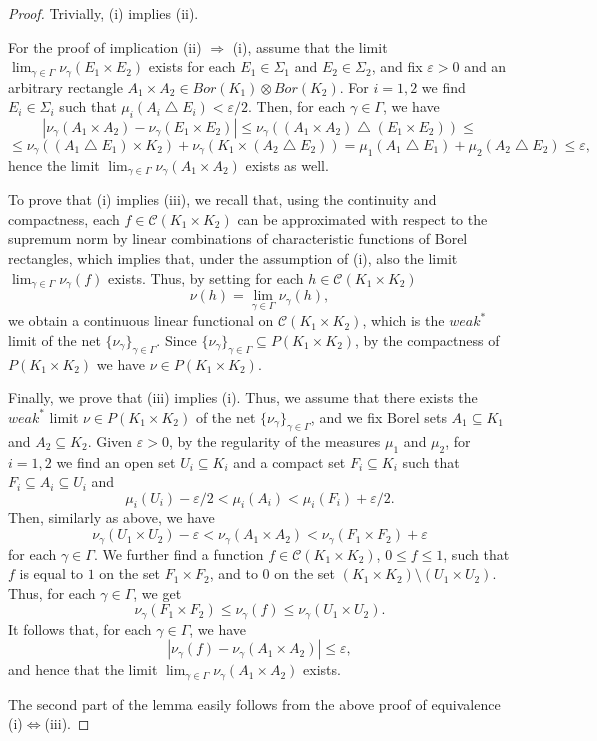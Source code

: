 \documentclass[12pt,fleqn]{amsart}
\numberwithin{equation}{section}
\theoremstyle{definition}
\def\C{\mathcal C}
\def\ep{\varepsilon}
\newcommand{\abs}[1]{\left| #1  \right|}
\begin{document}
\begin{proof}
Trivially, (i) implies (ii). 

For the proof of implication (ii) $\Rightarrow$ (i), assume that the limit $\lim_{\gamma \in \Gamma} \nu_{\gamma}(E_1 \times E_2)$ exists for each $E_1 \in \Sigma_1$ and $E_2 \in \Sigma_2$, and fix $\ep>0$ and an arbitrary rectangle $A_1 \times A_2 \in Bor(K_1) \otimes Bor(K_2)$. For $i=1, 2$ we find $E_i \in \Sigma_i$ such that $\mu_i(A_i \bigtriangleup E_i)<\ep/2$. Then, for each $\gamma \in \Gamma$, we have
\[|\nu_\gamma(A_1\times A_2)-\nu_\gamma(E_1\times E_2)|\le\nu_{\gamma}((A_1 \times A_2) \bigtriangleup (E_1 \times E_2))\leq\]
\[\le\nu_{\gamma}((A_1 \bigtriangleup E_1) \times K_2)+\nu_{\gamma}(K_1 \times (A_2 \bigtriangleup E_2)) =\mu_1(A_1 \bigtriangleup E_1)+\mu_2(A_2 \bigtriangleup E_2) \leq \ep,\]
hence the limit $\lim_{\gamma\in\Gamma}\nu_\gamma(A_1\times A_2)$ exists as well.

To prove that (i) implies (iii), we recall that, using the continuity and compactness, each $f \in \C(K_1 \times K_2)$ can be approximated with respect to the supremum norm by linear combinations of characteristic functions of Borel rectangles, which implies that, under the assumption of (i), also the limit $\lim_{\gamma \in \Gamma} \nu_{\gamma}(f)$ exists. Thus, by setting for each $h \in \C(K_1 \times K_2)$
\[\nu(h)=\lim_{\gamma \in \Gamma} \nu_{\gamma}(h),\]
we obtain a continuous linear functional on $\C(K_1 \times K_2)$,  which is the $weak^\ast$ limit of the net $\{ \nu_{\gamma} \}_{\gamma \in \Gamma}$. Since $\{ \nu_{\gamma} \}_{\gamma \in \Gamma}\subseteq P(K_1\times K_2)$, by the compactness of $P(K_1\times K_2)$ we have $\nu\in P(K_1 \times K_2)$.

Finally, we prove that (iii) implies (i). Thus, we assume that there exists the $weak^\ast$ limit $\nu\in P(K_1\times K_2)$ of the net $\{ \nu_{\gamma} \}_{\gamma \in \Gamma}$, and we fix Borel sets $A_1 \subseteq K_1$ and $A_2 \subseteq K_2$. Given $\ep>0$, by the regularity of the measures $\mu_1$ and $\mu_2$, for $i=1, 2$ we find an open set $U_i \subseteq K_i$ and a compact set $F_i \subseteq K_i$ such that $F_i \subseteq A_i \subseteq U_i$ and 
\[\mu_i(U_i)-\ep/2< \mu_i(A_i) < \mu_i(F_i)+\ep/2.\]
Then, similarly as above,  we have
\[\nu_{\gamma}(U_1 \times U_2)-\ep < \nu_{\gamma}(A_1 \times A_2) < \nu_{\gamma}(F_1 \times F_2)+\ep\]
for each $\gamma \in \Gamma$.
We further find a function $f \in \C(K_1 \times K_2)$, $0\le f\le 1$, such that $f$ is equal to $1$ on the set $F_1 \times F_2$, and to $0$ on the set $(K_1\times K_2)\setminus (U_1 \times U_2)$. Thus, for each $\gamma \in \Gamma$, we get
\[\nu_{\gamma}(F_1 \times F_2) \leq \nu_{\gamma}(f) \leq \nu_{\gamma}(U_1 \times U_2).\]
It follows that, for each $\gamma \in \Gamma$, we have
\[\abs{\nu_{\gamma}(f)-\nu_{\gamma}(A_1 \times A_2)} \leq \ep,\]
and hence that the limit $\lim_{\gamma\in\Gamma}\nu_\gamma(A_1\times A_2)$ exists.

\medskip

The second part of the lemma easily follows from the above proof of equivalence (i)$\Leftrightarrow$(iii). %
\end{proof}
\end{document}
